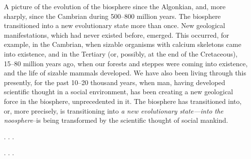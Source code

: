 A picture of the evolution of the biosphere since the Algonkian, and, more
sharply, since the Cambrian during 500--800 million years.  The biosphere
transitioned into a new evolutionary state
more than once.  New geological manifestations, which had never existed before,
emerged.  This occurred, for example, in the Cambrian, when sizable organisms
with calcium skeletons came into existence, and in the Tertiary (or, possibly,
at the end of the Cretaceous), 15--80 million years ago, when our forests and
steppes were coming into existence, and the life of sizable mammals developed.
We have also been living through this presently, for the past 10--20 thousand
years, when man, having developed scientific thought in a social environment,
has been creating a new geological force in the biosphere, unprecedented in it.
The biosphere has transitioned into, or, more precisely, is transitioning into
\emph{a new evolutionary state---into the noosphere}--is being transformed by
the scientific thought of social mankind.


\Section %

. . .

\Section %

. . .
